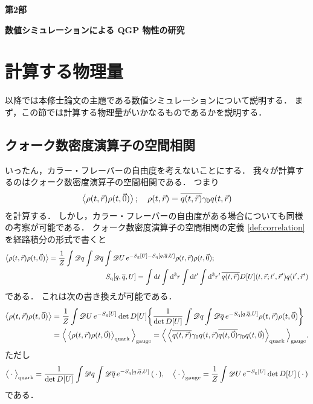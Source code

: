 \documentclass[dvipdfmx, a4paper]{jarticle}
\numberwithin{equation}{section}
\begin{document}
\newpage
\vfill
\centerline{\LARGE \textbf{第2部}}
\bigskip
\centerline{\LARGE \textbf{数値シミュレーションによる QGP 物性の研究}}
\vfill
{}

\newpage

\section{計算する物理量}
以降では本修士論文の主題である数値シミュレーションについて説明する．
まず，この節では計算する物理量がいかなるものであるかを説明する．

\subsection{クォーク数密度演算子の空間相関}
いったん，カラー・フレーバーの自由度を考えないことにする．
我々が計算するのはクォーク数密度演算子の空間相関である．
つまり
\begin{align}
  \ev{\rho(t, \vec{r})\rho(t, \vec{0})}; \quad \rho(t, \vec{r}) = \overline{q(t, \vec{r})} \gamma_0 q(t, \vec{r})
  \label{def:correlation}
\end{align}
を計算する．
しかし，カラー・フレーバーの自由度がある場合についても同様の考察が可能である．
クォーク数密度演算子の空間相関の定義 \eqref{def:correlation} を経路積分の形式で書くと
\begin{align}
  \ev{\rho(t, \vec{r})\rho(t, \vec{0})} &= \frac{1}{Z}\int \mathscr{D}q \int \mathscr{D}\overline{q} \int \mathscr{D} U \,
  e^{- S_\mathrm{g}[U] - S_\mathrm{q}[q, \overline{q}, U]} \rho(t, \vec{r})\rho(t, \vec{0});\notag\\
  &\quad\quad\quad\quad\quad\quad\quad\quad S_\mathrm{q}[q, \overline{q}, U] = \int \dd t \int \dd^3r \int \dd t' \int \dd^3r' \, \overline{q(t, \vec{r})} D[U](t, \vec{r}; t', \vec{r}') q(t', \vec{r}')
\end{align}
である．
これは次の書き換えが可能である．
\begin{align}
  \ev{\rho(t, \vec{r})\rho(t, \vec{0})} &= \frac{1}{Z} \int \mathscr{D} U \, e^{-S_\mathrm{g}[U]} \det D[U] \qty{\frac{1}{\det D[U]} \int \mathscr{D}q \int \mathscr{D}\overline{q}\, e^{-S_\mathrm{q}[q, \overline{q}, U]}\rho(t, \vec{r})\rho(t, \vec{0})} \notag\\
  &= \Big<\ev{\rho(t, \vec{r})\rho(t, \vec{0})}_\mathrm{quark}\Big>_\mathrm{gauge} = \Big<\ev{\overline{q(t, \vec{r})} \gamma_0 q(t, \vec{r}) \overline{q(t, \vec{0})} \gamma_0 q(t, \vec{0})}_\mathrm{quark}\Big>_\mathrm{gauge}.
\end{align}
ただし
\begin{align}
  \big<\cdot\big>_\mathrm{quark} = \frac{1}{\det D[U]} \int \mathscr{D}q \int \mathscr{D}\overline{q}\, e^{-S_\mathrm{q}[q, \overline{q}, U]}\, \qty(\,\cdot\,), \quad \big<\cdot\big>_\mathrm{gauge} = \frac{1}{Z} \int \mathscr{D} U \, e^{-S_\mathrm{g}[U]} \det D[U] \, (\,\cdot\,)
\end{align}
である．
\end{document}
